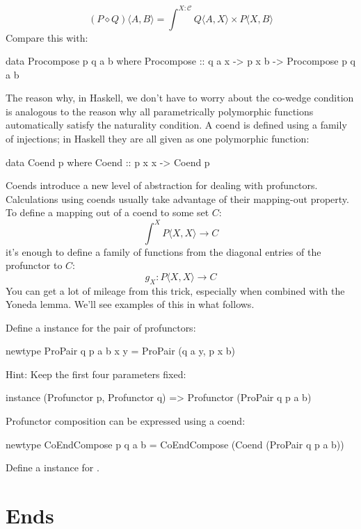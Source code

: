 \documentclass[DaoFP]{subfiles}
\begin{document}
\[ (P \diamond Q)\langle A, B \rangle = \int^{X\colon \mathcal{C}} Q \langle A, X \rangle \times P \langle X, B \rangle\]
Compare this with:
\begin{haskell}
data Procompose p q a b where
  Procompose ::  q a x -> p x b -> Procompose p q a b
\end{haskell}

The reason why, in Haskell, we don't have to worry about the co-wedge condition is analogous to the reason why all parametrically polymorphic functions automatically satisfy the naturality condition. A coend is defined using a family of injections; in Haskell they are all given as one polymorphic function:
\begin{haskell}
data Coend p where
  Coend ::  p x x -> Coend p
\end{haskell}

Coends introduce a new level of abstraction for dealing with profunctors. Calculations using coends usually take advantage of their mapping-out property. To define a mapping out of a coend to some set $C$:
\[ \int^X P \langle X, X \rangle \to C \]
 it's enough to define a family of functions from the diagonal entries of the profunctor to $C$:
 \[ g_X \colon P \langle X, X \rangle \to C \]
 You can get a lot of mileage from this trick, especially when combined with the Yoneda lemma. We'll see examples of this in what follows.

\begin{exercise}
Define a  instance for the pair of profunctors:
\begin{haskell}
newtype ProPair q p a b x y = ProPair (q a y, p x b)
\end{haskell}
Hint: Keep the first four parameters fixed:
\begin{haskell}
instance (Profunctor p, Profunctor q) => Profunctor (ProPair q p a b)
\end{haskell}
\end{exercise}

\begin{exercise}
Profunctor composition can be expressed using a coend:
\begin{haskell}
newtype CoEndCompose p q a b = CoEndCompose (Coend (ProPair q p a b))
\end{haskell}
Define a  instance for .
\end{exercise}


\section{Ends}
\end{document}
